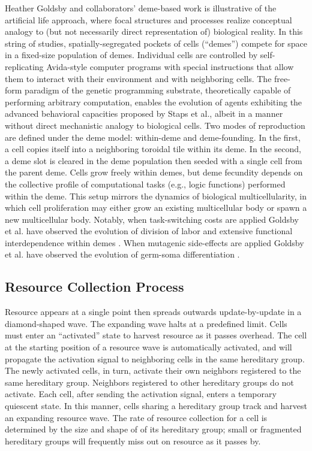 Heather Goldsby and collaborators' deme-based work is illustrative of the artificial life approach, where focal structures and processes realize conceptual analogy to (but not necessarily direct representation of) biological reality.
In this string of studies, spatially-segregated pockets of cells (``demes'') compete for space in a fixed-size population of demes.
Individual cells are controlled by self-replicating Avida-style computer programs with special instructions that allow them to interact with their environment and with neighboring cells.
The free-form paradigm of the genetic programming substrate, theoretically capable of performing arbitrary computation, enables the evolution of agents exhibiting the advanced behavioral capacities proposed by Staps et al., albeit in a manner without direct mechanistic analogy to biological cells.
Two modes of reproduction are defined under the deme model: within-deme and deme-founding.
In the first, a cell copies itself into a neighboring toroidal tile within its deme.
In the second, a deme slot is cleared in the deme population then seeded with a single cell from the parent deme.
Cells grow freely within demes, but deme fecundity depends on the collective profile of computational tasks (e.g., logic functions) performed within the deme.
This setup mirrors the dynamics of biological multicellularity, in which cell proliferation may either grow an existing multicellular body or spawn a new multicellular body.
Notably, when task-switching costs are applied Goldsby et al. have observed the evolution of division of labor and extensive functional interdependence within demes \citep{goldsby2012task}.
When mutagenic side-effects are applied Goldsby et al. have observed the evolution of germ-soma differentiation \citep{goldsby2014evolutionary}.

\subsection{Resource Collection Process} \label{sup:resource_collection_process}

Resource appears at a single point then spreads outwards update-by-update in a diamond-shaped wave.
The expanding wave halts at a predefined limit.
Cells must enter an ``activated'' state to harvest resource as it passes overhead.
The cell at the starting position of a resource wave is automatically activated, and will propagate the activation signal to neighboring cells in the same hereditary group.
The newly activated cells, in turn, activate their own neighbors registered to the same hereditary group.
Neighbors registered to other hereditary groups do not activate.
Each cell, after sending the activation signal, enters a temporary quiescent state.
In this manner, cells sharing a hereditary group track and harvest an expanding resource wave.
The rate of resource collection for a cell is determined by the size and shape of of its hereditary group;
small or fragmented hereditary groups will frequently miss out on resource as it passes by.

